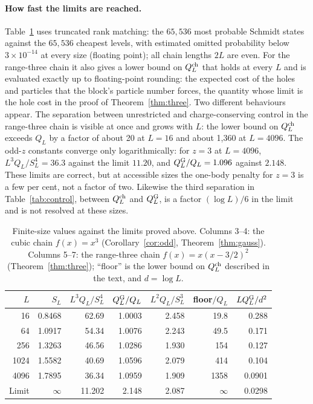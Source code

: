 \documentclass[11pt,a4paper]{article}
\theoremstyle{remark}
\begin{document}
\paragraph{How fast the limits are reached.} Table~\ref{tab:converge} uses truncated rank matching: the $65{,}536$ most probable Schmidt states against the $65{,}536$ cheapest levels, with estimated omitted probability below $3\times10^{-14}$ at every size (floating point); all chain lengths $2L$ are even. For the range-three chain it also gives a lower bound on $Q_L^{\rm ch}$ that holds at every $L$ and is evaluated exactly up to floating-point rounding: the expected cost of the holes and particles that the block's particle number forces, the quantity whose limit is the hole cost in the proof of Theorem~\ref{thm:three}. Two different behaviours appear. The separation between unrestricted and charge-conserving control in the range-three chain is visible at once and grows with $L$: the lower bound on $Q_L^{\rm ch}$ exceeds $Q_L$ by a factor of about 20 at $L=16$ and about 1,360 at $L=4096$. The odd-$z$ constants converge only logarithmically: for $z=3$ at $L=4096$, $L^3Q_L/S_L^4=36.3$ against the limit $11.20$, and $Q_L^{\rm G}/Q_L=1.096$ against $2.148$. These limits are correct, but at accessible sizes the one-body penalty for $z=3$ is a few per cent, not a factor of two. Likewise the third separation in Table~\ref{tab:control}, between $Q_L^{\rm ch}$ and $Q_L^{\rm G}$, is a factor $(\log L)/6$ in the limit and is not resolved at these sizes.

\begin{table}[htbp]\centering\small
\caption{Finite-size values against the limits proved above. Columns 3--4: the cubic chain $f(x)=x^3$ (Corollary~\ref{cor:odd}, Theorem~\ref{thm:gauss}). Columns 5--7: the range-three chain $f(x)=x(x-3/2)^2$ (Theorem~\ref{thm:three}); ``floor'' is the lower bound on $Q_L^{\rm ch}$ described in the text, and $d=\log L$.}\label{tab:converge}
\begin{tabular}{rrrrrrr}
\toprule
$L$ & $S_L$ & $L^3Q_L/S_L^4$ & $Q_L^{\rm G}/Q_L$ & $L^2Q_L/S_L^3$ & floor$/Q_L$ & $LQ_L^{\rm G}/d^2$\\
\midrule
16 & 0.8468 & 62.69 & 1.0003 & 2.458 & 19.8 & 0.288\\
64 & 1.0917 & 54.34 & 1.0076 & 2.243 & 49.5 & 0.171\\
256 & 1.3263 & 46.56 & 1.0286 & 1.930 & 154 & 0.127\\
1024 & 1.5582 & 40.69 & 1.0596 & 2.079 & 414 & 0.104\\
4096 & 1.7895 & 36.34 & 1.0959 & 1.909 & 1358 & 0.0901\\
\midrule
Limit & $\infty$ & 11.202 & 2.148 & 2.087 & $\infty$ & 0.0298\\
\bottomrule
\end{tabular}
\end{table}
\end{document}
